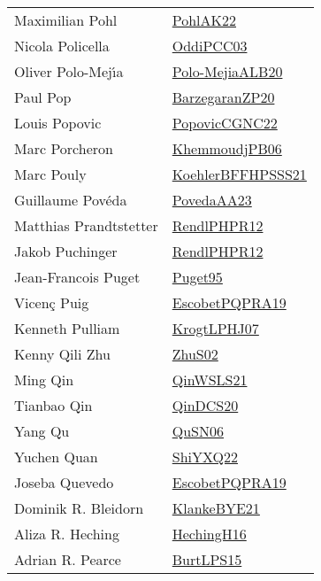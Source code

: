 {\begin{longtable}{p{4cm}p{20cm}}
Maximilian Pohl & \href{articles/PohlAK22.pdf}{PohlAK22}\cite{PohlAK22} \\
Nicola Policella & \href{papers/OddiPCC03.pdf}{OddiPCC03}\cite{OddiPCC03} \\
Oliver Polo{-}Mej{\'{\i}}a & \href{}{Polo-MejiaALB20}\cite{Polo-MejiaALB20} \\
Paul Pop & \href{papers/BarzegaranZP20.pdf}{BarzegaranZP20}\cite{BarzegaranZP20} \\
Louis Popovic & \href{papers/PopovicCGNC22.pdf}{PopovicCGNC22}\cite{PopovicCGNC22} \\
Marc Porcheron & \href{papers/KhemmoudjPB06.pdf}{KhemmoudjPB06}\cite{KhemmoudjPB06} \\
Marc Pouly & \href{articles/KoehlerBFFHPSSS21.pdf}{KoehlerBFFHPSSS21}\cite{KoehlerBFFHPSSS21} \\
Guillaume Pov{\'{e}}da & \href{papers/PovedaAA23.pdf}{PovedaAA23}\cite{PovedaAA23} \\
Matthias Prandtstetter & \href{papers/RendlPHPR12.pdf}{RendlPHPR12}\cite{RendlPHPR12} \\
Jakob Puchinger & \href{papers/RendlPHPR12.pdf}{RendlPHPR12}\cite{RendlPHPR12} \\
Jean{-}Francois Puget & \href{papers/Puget95.pdf}{Puget95}\cite{Puget95} \\
Vicen{\c{c}} Puig & \href{articles/EscobetPQPRA19.pdf}{EscobetPQPRA19}\cite{EscobetPQPRA19} \\
Kenneth Pulliam & \href{papers/KrogtLPHJ07.pdf}{KrogtLPHJ07}\cite{KrogtLPHJ07} \\
Kenny Qili Zhu & \href{papers/ZhuS02.pdf}{ZhuS02}\cite{ZhuS02} \\
Ming Qin & \href{articles/QinWSLS21.pdf}{QinWSLS21}\cite{QinWSLS21} \\
Tianbao Qin & \href{articles/QinDCS20.pdf}{QinDCS20}\cite{QinDCS20} \\
Yang Qu & \href{papers/QuSN06.pdf}{QuSN06}\cite{QuSN06} \\
Yuchen Quan & \href{}{ShiYXQ22}\cite{ShiYXQ22} \\
Joseba Quevedo & \href{articles/EscobetPQPRA19.pdf}{EscobetPQPRA19}\cite{EscobetPQPRA19} \\
Dominik R. Bleidorn & \href{papers/KlankeBYE21.pdf}{KlankeBYE21}\cite{KlankeBYE21} \\
Aliza R. Heching & \href{papers/HechingH16.pdf}{HechingH16}\cite{HechingH16} \\
Adrian R. Pearce & \href{papers/BurtLPS15.pdf}{BurtLPS15}\cite{BurtLPS15} \\

\end{longtable}}
